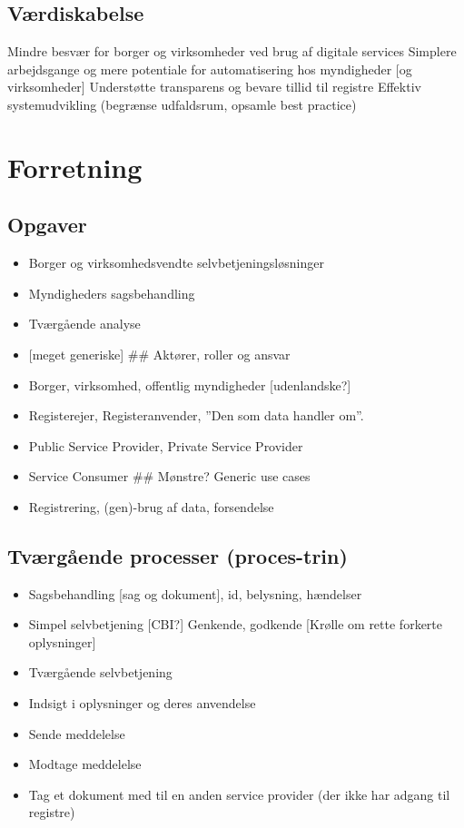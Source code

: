 \subsection{Værdiskabelse}\label{vuxe6rdiskabelse}

Mindre besvær for borger og virksomheder ved brug af digitale services
Simplere arbejdsgange og mere potentiale for automatisering hos
myndigheder {[}og virksomheder{]} Understøtte transparens og bevare
tillid til registre Effektiv systemudvikling (begrænse udfaldsrum,
opsamle best practice)

\section{Forretning}\label{forretning}

\subsection{Opgaver}\label{opgaver}

\begin{itemize}
\tightlist
\item
  Borger og virksomhedsvendte selvbetjeningsløsninger
\item
  Myndigheders sagsbehandling
\item
  Tværgående analyse
\item
  {[}meget generiske{]} \#\# Aktører, roller og ansvar
\item
  Borger, virksomhed, offentlig myndigheder {[}udenlandske?{]}
\item
  Registerejer, Registeranvender, ''Den som data handler om''.
\item
  Public Service Provider, Private Service Provider
\item
  Service Consumer \#\# Mønstre? Generic use cases
\item
  Registrering, (gen)-brug af data, forsendelse
\end{itemize}

\subsection{Tværgående processer
(proces-trin)}\label{tvuxe6rguxe5ende-processer-proces-trin}

\begin{itemize}
\item
  Sagsbehandling {[}sag og dokument{]}, id, belysning, hændelser
\item
  Simpel selvbetjening {[}CBI?{]} Genkende, godkende {[}Krølle om rette
  forkerte oplysninger{]}
\item
  Tværgående selvbetjening
\item
  Indsigt i oplysninger og deres anvendelse
\item
  Sende meddelelse
\item
  Modtage meddelelse
\item
  Tag et dokument med til en anden service provider (der ikke har adgang
  til registre)
\end{itemize}

